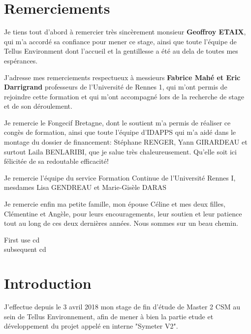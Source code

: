 \documentclass[12pt,a4paper]{report}
\begin{document}
\chapter*{Remerciements}%
\thispagestyle{empty}%

\para Je tiens tout d'abord à remercier très sincèrement monsieur \textbf{Geoffroy ETAIX}, qui m'a accordé sa confiance pour mener ce stage, ainsi que toute l'équipe de Tellus Environment dont l'accueil et la gentillesse a été au dela de toutes mes espérances.

\para J'adresse mes remerciements respectueux à messieurs \textbf{Fabrice Mahé et Eric Darrigrand} professeurs de l'Université de Rennes 1, qui m'ont permis de rejoindre cette formation et qui m'ont accompagné lors de la recherche de stage et de son  déroulement.

\para Je remercie le Fongecif Bretagne, dont le soutient m'a permis de réaliser ce congès de formation, ainsi que toute l'équipe d'IDAPPS qui m'a aidé dans le montage du dossier de financement: Stéphane RENGER, Yann GIRARDEAU et surtout Laila BENLARIBI, que je salue très chaleureusement. Qu'elle soit ici félicitée de sa redoutable efficacité! 

\para Je remercie l'équipe du service Formation Continue de l'Université Rennes I, mesdames Lisa GENDREAU et Marie-Gisèle DARAS

\para Je remercie enfin ma petite famille, mon épouse Céline et mes deux filles, Clémentine et Angèle, pour leurs encouragements, leur soutien et leur patience tout au long de ces deux dernières années. Nous sommes sur un beau chemin.


\glsaddall
\para First use \gls{cd}\\
subsequent \gls{cd}



\setcounter{tocdepth}{5}
\tableofcontents

\printglossaries

\chapter{Introduction}

J'effectue depuis le 3 avril 2018 mon stage de fin d'étude de Master 2 CSM au sein de Tellus Environnement, afin de mener à bien la partie etude et développement du projet appelé en interne "Symeter V2".
\end{document}
